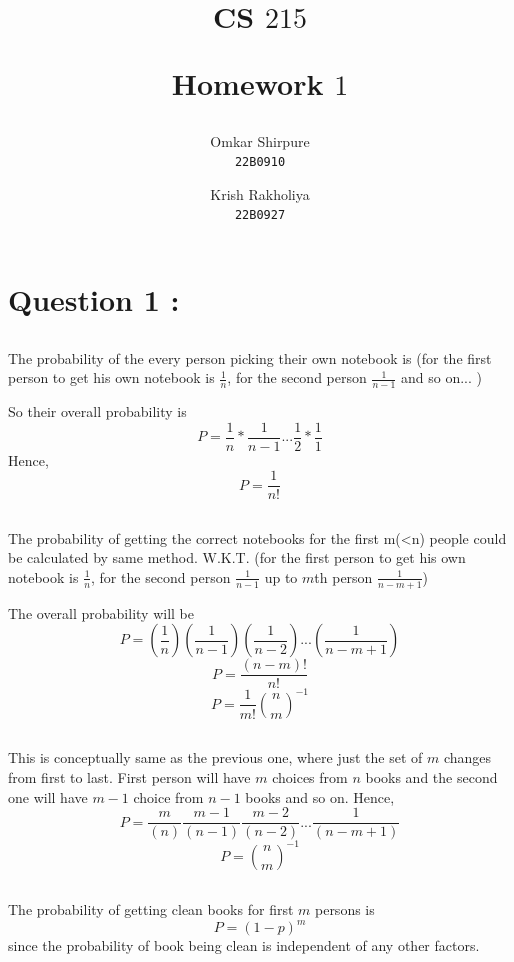 \documentclass[11pt,a4paper,titlepage]{article}
\title{ CS $215$ 

\blueb Homework $1$}
\author{
  Omkar Shirpure\\
  \texttt{22B0910}
  \and
  Krish Rakholiya\\
  \texttt{22B0927}
}
\date{}
\begin{document}
\maketitle

\section{Question 1 : }{
\subsection{}{
The probability of the every person picking their own notebook is (for the first person to get his own notebook is $\frac{1}{n}$, for the second person $\frac{1}{n-1}$ and so on... ) 

So their overall probability is
$$P = \frac{1}{n}*\frac{1}{n-1} ... \frac{1}{2}*\frac{1}{1}$$
Hence,
$$P = \frac{1}{n!}$$
}

\subsection{}{
The probability of getting the correct notebooks for the first m(<n) people could be calculated by same method. W.K.T. (for the first person to get his own notebook is $\frac{1}{n}$, for the second person $\frac{1}{n-1}$ up to $m$th person $\frac{1}{n-m+1}$)

\vspace{0.2cm}
The overall probability will be
$$P = (\frac{1}{n})(\frac{1}{n-1})(\frac{1}{n-2})...(\frac{1}{n-m+1})$$
$$P = \frac{(n-m)!}{n!}$$
$$P = \frac{1}{m!}\binom{n}{m}^{-1}$$
}

\subsection{}{
This is conceptually same as the previous one, where just the set of $m$ changes from first to last. First person will have $m$ choices from $n$ books and the second one will have $m-1$ choice from $n-1$ books and so on.
Hence,
$$P = \frac{m}{(n)}\frac{m-1}{(n-1)}\frac{m-2}{(n-2)}...\frac{1}{(n-m+1)}$$
$$P = \binom{n}{m}^{-1}$$
}

\subsection{}{
The probability of getting clean books for first $m$ persons is 
$$P = (1-p)^m$$
since the probability of book being clean is independent of any other factors.
}

}
\end{document}

